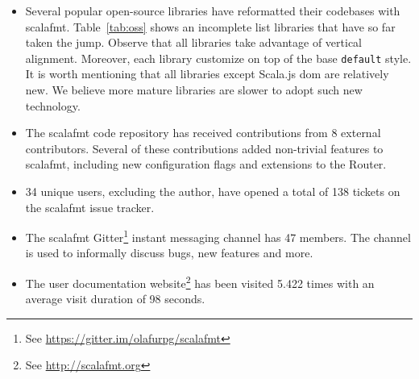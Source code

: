 \begin{itemize}
  \item Several popular open-source libraries have reformatted their codebases with scalafmt.
    Table~\ref{tab:oss} shows an incomplete list libraries that have so far taken the jump.
    Observe that all libraries take advantage of vertical alignment.
    Moreover, each library customize on top of the base \texttt{default} style.
    It is worth mentioning that all libraries except Scala.js dom are relatively new.
    We believe more mature libraries are slower to adopt such new technology.
  \item The scalafmt code repository has received contributions from 8 external contributors.
    Several of these contributions added non-trivial features to scalafmt, including
    new configuration flags and extensions to the Router.
  \item 34 unique users, excluding the author, have opened a total of 138 tickets on the scalafmt issue tracker.
  \item The scalafmt Gitter\footnote{See \url{https://gitter.im/olafurpg/scalafmt}} instant messaging channel has 47 members. The channel is used to informally discuss bugs, new features and more.
  \item The user documentation website\footnote{See \url{http://scalafmt.org}} has been visited 5.422 times with an average visit duration of 98 seconds.
\end{itemize}



